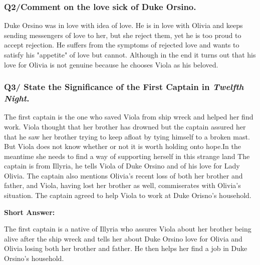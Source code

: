 \documentclass[12pt, a4paper]{article}
\begin{document}
\subsubsection*{Q2/Comment on the love sick of Duke Orsino.}

Duke Orsino was in love with idea of love. He is in love with Olivia
and keeps sending messengers of love to her, but she reject them, yet he 
is too proud to accept rejection. He suffers from the symptoms of 
rejected love and wants to satisfy his "appetite" of love but cannot.
Although in the end it turns out that his love for Olivia is not genuine
because he chooses Viola as his beloved.

\subsubsection*{Q3/ State the Significance of the First Captain in 
\textit{Twelfth Night}.}

The first captain is the one who saved Viola from ship wreck and 
helped her find work. Viola thought that her brother has drowned but 
the captain assured her that he saw her brother trying to keep afloat 
by tying himself to a broken mast. But Viola does not know whether 
or not it is worth holding onto hope.In the meantime she needs to find 
a way of supporting herself in this strange land The captain is from 
Illyria, he tells Viola of Duke Orsino and of his love for Lady Olivia. 
The captain also mentions Olivia's recent loss of both her brother and 
father,  and Viola, having lost her brother as well, commiserates with 
Olivia's situation. The captain agreed to help Viola to work at Duke 
Orisno's household.\medbreak

\textbf{Short Answer:}\medbreak

The first captain is a native of Illyria who assures Viola about her
brother being alive after the ship wreck and tells her about Duke Orsino
love for Olivia and Olivia losing both her brother and father. 
He then helps her find a job in Duke Orsino's household.


\subsection*{}
\end{document}
